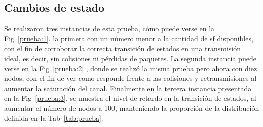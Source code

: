 \begin{justify}
\subsection{Cambios de estado}
Se realizaron tres instancias de esta prueba, cómo puede verse en la Fig~\ref{prueba:1}, la primera con un número menor a la cantidad de \gls{sf} disponibles, con el fin de corroborar la correcta transición de estados en una transmisión ideal, es decir, sin colisiones ni pérdidas de paquetes. La segunda instancia puede verse en la Fig~\ref{prueba:2} , donde se realizó la misma prueba pero ahora con diez nodos, con el fin de ver como responde frente a las colisiones y retransmisiones al aumentar la saturación del canal. Finalmente en la tercera instancia presentada en la Fig~\ref{prueba:3}, se muestra el nivel de retardo en la transición de estados, al aumentar el número de nodos a 100, manteniendo la proporción de la distribución definida en la Tab~\ref{tab:prueba}.\\
\begin{figure}[!ht]
\centering

\end{figure}
\end{justify}
